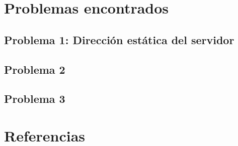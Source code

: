 \documentclass{article}
\begin{document}
\section{Problemas encontrados}
\subsection{Problema 1: Dirección estática del servidor} 
\subsection{Problema 2}
\subsection{Problema 3}
\section{Referencias}
\end{document}
